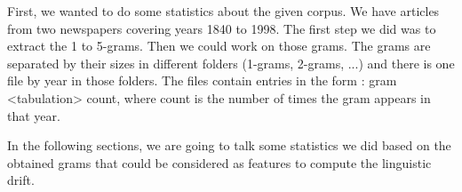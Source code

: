 First, we wanted to do some statistics about the given corpus. We have articles from two newspapers covering years 1840 to 1998. The first step we did was to extract the 1 to 5-grams. Then we could work on those grams. The grams are separated by their sizes in different folders (1-grams, 2-grams, ...) and there is one file by year in those folders. The files contain entries in the form : gram <tabulation> count, where count is the number of times the gram appears in that year.

In the following sections, we are going to talk some statistics we did based on the obtained grams that could be considered as features to compute the linguistic drift.
